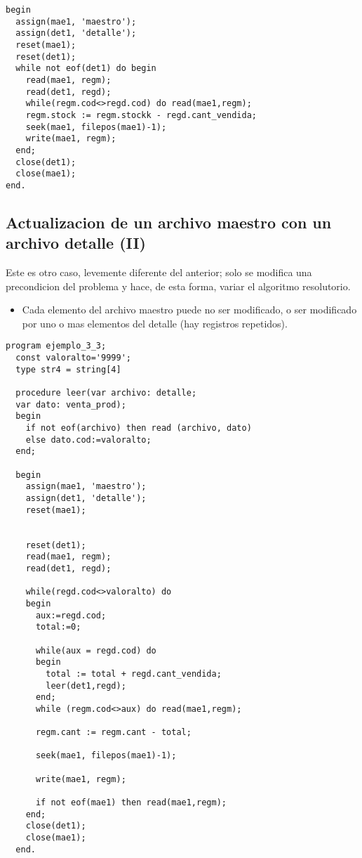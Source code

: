 \begin{lstlisting}
begin
  assign(mae1, 'maestro');
  assign(det1, 'detalle');
  reset(mae1);
  reset(det1);
  while not eof(det1) do begin
    read(mae1, regm);
    read(det1, regd);
    while(regm.cod<>regd.cod) do read(mae1,regm);
    regm.stock := regm.stockk - regd.cant_vendida;
    seek(mae1, filepos(mae1)-1);
    write(mae1, regm);
  end;
  close(det1);
  close(mae1);
end.
\end{lstlisting}

\subsection{Actualizacion de un archivo maestro con un archivo detalle (II)}

Este es otro caso, levemente diferente del anterior; solo se modifica una precondicion del problema y hace, de esta forma, variar el algoritmo resolutorio.

\begin{itemize}
    \item Cada elemento del archivo maestro puede no ser modificado, o ser modificado por uno o mas elementos del detalle (hay registros repetidos).
\end{itemize}

\begin{lstlisting}
program ejemplo_3_3;
  const valoralto='9999';
  type str4 = string[4]

  procedure leer(var archivo: detalle;
  var dato: venta_prod);
  begin
    if not eof(archivo) then read (archivo, dato)
    else dato.cod:=valoralto;
  end;

  begin
    assign(mae1, 'maestro');
    assign(det1, 'detalle');
    reset(mae1);


    reset(det1);
    read(mae1, regm);
    read(det1, regd);

    while(regd.cod<>valoralto) do
    begin
      aux:=regd.cod;
      total:=0;

      while(aux = regd.cod) do
      begin
        total := total + regd.cant_vendida;
        leer(det1,regd);
      end;
      while (regm.cod<>aux) do read(mae1,regm);

      regm.cant := regm.cant - total;

      seek(mae1, filepos(mae1)-1);

      write(mae1, regm);

      if not eof(mae1) then read(mae1,regm);
    end;
    close(det1);
    close(mae1);
  end.
\end{lstlisting}

